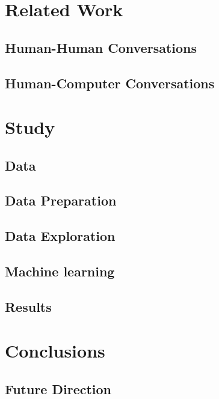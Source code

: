 \documentclass[copyright,masters]{cslu-thesis}
\begin{document}
\chapter{Related Work}

\section{Human-Human Conversations}

\section{Human-Computer Conversations}

\chapter{Study}
\section{Data}

\section{Data Preparation}

\clearpage
\section{Data Exploration}

\clearpage
\section{Machine learning}

\section{Results}

\chapter{Conclusions}

\section{Future Direction}



\appendix


\nocite{*} %


\end{document}
